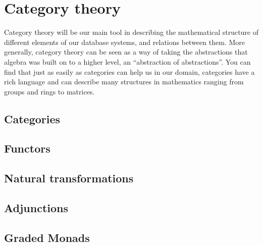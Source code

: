 \section{Category theory}
Category theory will be our main tool in describing the mathematical structure of different elements of our database systems, and relations between them. More generally, category theory can be seen as a way of taking the abstractions that algebra was built on to a higher level, an ``abstraction of abstractions''. You can find that just as easily as categories can help us in our domain, categories have a rich language and can describe many structures in mathematics ranging from groups and rings to matrices. 
\subsection{Categories}
\subsection{Functors}
\subsection{Natural transformations}
\subsection{Adjunctions}
\subsection{Graded Monads}